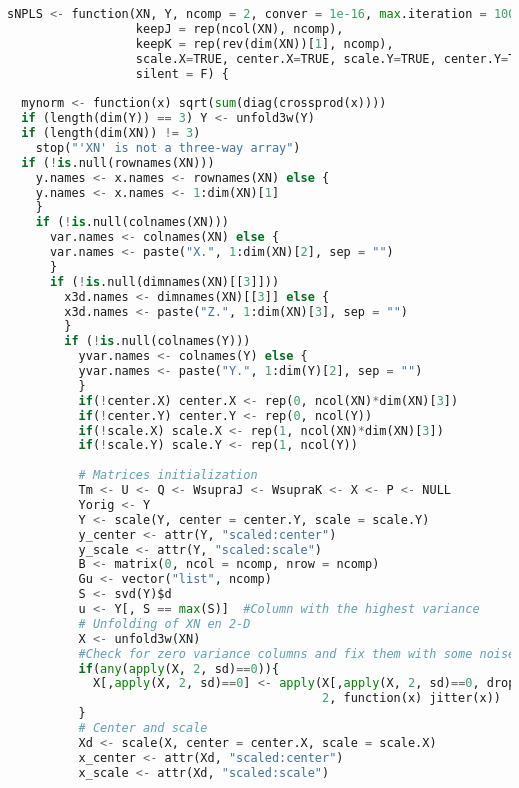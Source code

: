 \begin{scriptsize}
\begin{lstlisting}[language=Python, caption=sNPLS main function]
sNPLS <- function(XN, Y, ncomp = 2, conver = 1e-16, max.iteration = 10000,
                  keepJ = rep(ncol(XN), ncomp), 
                  keepK = rep(rev(dim(XN))[1], ncomp),
                  scale.X=TRUE, center.X=TRUE, scale.Y=TRUE, center.Y=TRUE, 
                  silent = F) {
  
  mynorm <- function(x) sqrt(sum(diag(crossprod(x))))
  if (length(dim(Y)) == 3) Y <- unfold3w(Y)
  if (length(dim(XN)) != 3)
    stop("'XN' is not a three-way array")
  if (!is.null(rownames(XN)))
    y.names <- x.names <- rownames(XN) else {
    y.names <- x.names <- 1:dim(XN)[1]
    }
    if (!is.null(colnames(XN)))
      var.names <- colnames(XN) else {
      var.names <- paste("X.", 1:dim(XN)[2], sep = "")
      }
      if (!is.null(dimnames(XN)[[3]]))
        x3d.names <- dimnames(XN)[[3]] else {
        x3d.names <- paste("Z.", 1:dim(XN)[3], sep = "")
        }
        if (!is.null(colnames(Y)))
          yvar.names <- colnames(Y) else {
          yvar.names <- paste("Y.", 1:dim(Y)[2], sep = "")
          }
          if(!center.X) center.X <- rep(0, ncol(XN)*dim(XN)[3])
          if(!center.Y) center.Y <- rep(0, ncol(Y))
          if(!scale.X) scale.X <- rep(1, ncol(XN)*dim(XN)[3])
          if(!scale.Y) scale.Y <- rep(1, ncol(Y))
          
          # Matrices initialization
          Tm <- U <- Q <- WsupraJ <- WsupraK <- X <- P <- NULL
          Yorig <- Y
          Y <- scale(Y, center = center.Y, scale = scale.Y)
          y_center <- attr(Y, "scaled:center")
          y_scale <- attr(Y, "scaled:scale")
          B <- matrix(0, ncol = ncomp, nrow = ncomp)
          Gu <- vector("list", ncomp)
          S <- svd(Y)$d
          u <- Y[, S == max(S)]  #Column with the highest variance
          # Unfolding of XN en 2-D
          X <- unfold3w(XN)
          #Check for zero variance columns and fix them with some noise
          if(any(apply(X, 2, sd)==0)){
            X[,apply(X, 2, sd)==0] <- apply(X[,apply(X, 2, sd)==0, drop=F], 
                                            2, function(x) jitter(x))
          }
          # Center and scale
          Xd <- scale(X, center = center.X, scale = scale.X)
          x_center <- attr(Xd, "scaled:center")
          x_scale <- attr(Xd, "scaled:scale")
          

\end{lstlisting}
\end{scriptsize}
